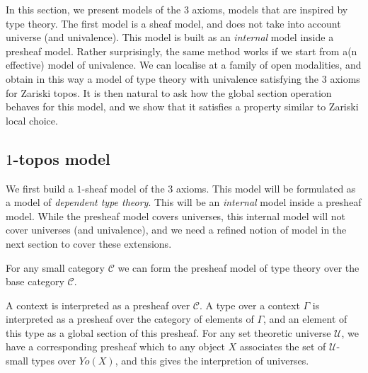 \newcommand{\inc}{\mathsf{inc}}
\newcommand{\inl}{\mathsf{inl}}
\newcommand{\inr}{\mathsf{inr}}
\newcommand{\II}{\mathbf{I}}
\newcommand\norm[1]{\left\lVert #1 \right\rVert}


\newcommand{\Gm}{\mathsf{G_m}}
\newcommand{\ext}{\mathsf{ext}}
\newcommand{\patch}{\mathsf{patch}}
\newcommand{\cov}{\mathsf{cov}}
\newcommand{\isSheaf}{\mathsf{isSheaf}}
\newcommand{\Fib}{\mathsf{Fib}}

\newcommand{\BB}{\mathcal{B}}
\newcommand{\CC}{\mathcal{C}}
\newcommand{\UU}{\mathcal{U}}

In this section, we present models of the 3 axioms, models that are inspired by type theory. The first model is a sheaf model, and does not
take into account universe (and univalence). This model is built
as an {\em internal} model inside a presheaf model. Rather surprisingly, the same method
works if we start from a(n effective) model of univalence. We can localise at a family of open modalities, and  obtain
in this way a model of type theory with univalence satisfying the
3 axioms for Zariski topos. It is then natural to ask how the global section operation behaves for this model, and we show that
it satisfies a property similar to Zariski local choice. 

\subsection{$1$-topos model}

We first build a $1$-sheaf model of the 3 axioms. This model will be formulated as a model of {\em dependent type theory}.
This will be an {\em internal} model inside a presheaf model. While the presheaf model covers universes, this internal model
will not cover universes (and univalence), and we need a refined notion of model in the next section to cover these extensions.

For any small category $\CC$ we can form the presheaf model of type theory over the base category $\CC$.

A context is interpreted as a presheaf over $\CC$. A type over a context $\Gamma$ is interpreted as
a presheaf over the category of elements of $\Gamma$, and an element of this type as a global section
of this presheaf. For any set theoretic universe $\UU$, we have a corresponding presheaf which to
any object $X$ associates the set of $\UU$-small types over $Yo(X)$, and this gives the interpretion
of universes. 

\medskip

